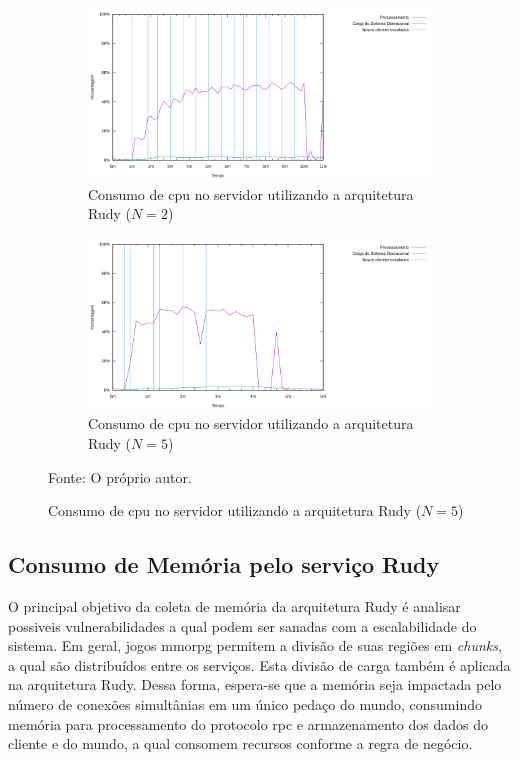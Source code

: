 \begin{figure}[htb!]
    \caption{Topologia da rede no gestor de redes do OpenStack.}
    \centering
    \begin{subfigure}{1.0\textwidth}
      \centering
      \includegraphics[width=.9\textwidth]{metricas_rudy_t5/cpu.png}
      \caption{Consumo de \ac{cpu} no servidor utilizando a arquitetura Rudy ($N=2$)}
      \label{fig:rudy_t5_cpu}
    \end{subfigure}


    \begin{subfigure}{1.0\textwidth}
      \centering
      \includegraphics[width=.9\textwidth]{metricas_rudy_t6/cpu.png}
      \caption{Consumo de \ac{cpu} no servidor utilizando a arquitetura Rudy ($N=5$)}
      \label{fig:rudy_t6_cpu}
    \end{subfigure}
    \label{fig:rudy_t56_cpu}

    Fonte: O próprio autor.
\end{figure}


\subsection{Consumo de Memória pelo serviço Rudy}

O principal objetivo da coleta de memória da arquitetura Rudy é analisar possiveis vulnerabilidades a qual podem ser sanadas com a escalabilidade do sistema.
%
Em geral, jogos \ac{mmorpg} permitem a divisão de suas regiões em \textit{chunks}, a qual são distribuídos entre os serviços.
%
Esta divisão de carga também é aplicada na arquitetura Rudy.
%
Dessa forma, espera-se que a memória seja impactada pelo número de conexões simultânias em um único pedaço do mundo, consumindo memória para processamento do protocolo \ac{rpc} e armazenamento dos dados do cliente e do mundo, a qual consomem recursos conforme a regra de negócio.

